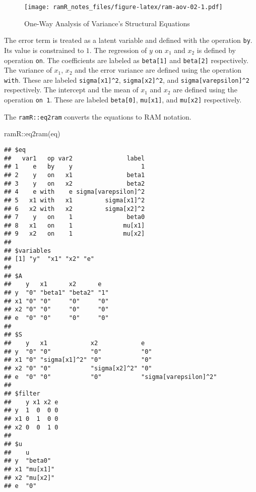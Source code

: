 \documentclass[
]{book}
\newenvironment{Shaded}{\begin{snugshade}}{\end{snugshade}}
\newcommand{\FunctionTok}[1]{\textcolor[rgb]{0.00,0.00,0.00}{#1}}
\newcommand{\NormalTok}[1]{#1}
\newcommand{\SpecialCharTok}[1]{\textcolor[rgb]{0.00,0.00,0.00}{#1}}
\theoremstyle{definition}
\theoremstyle{definition}
\theoremstyle{definition}
\theoremstyle{remark}
\begin{document}
\begin{figure}
\centering
\texttt{[image: ramR\_notes\_files/figure-latex/ram-aov-02-1.pdf]}
\caption{\label{fig:ram-aov-02}One-Way Analysis of Variance's Structural Equations}
\end{figure}

The error term is treated as a latent variable
and defined with the operation \texttt{by}.
Its value is constrained to \(1\).
The regression of \(y\) on \(x_1\) and \(x_2\) is defined by operation \texttt{on}.
The coefficients are labeled as \texttt{beta{[}1{]}} and \texttt{beta{[}2{]}} respectively.
The variance of \(x_1\), \(x_2\) and the error variance
are defined using the operation \texttt{with}.
These are labeled \texttt{sigma{[}x1{]}\^{}2}, \texttt{sigma{[}x2{]}\^{}2}, and \texttt{sigma{[}varepsilon{]}\^{}2} respectively.
The intercept and the mean of \(x_1\) and \(x_2\) are defined using the operation \texttt{on\ 1}.
These are labeled \texttt{beta{[}0{]}}, \texttt{mu{[}x1{]}}, and \texttt{mu{[}x2{]}} respectively.

The \texttt{ramR::eq2ram} converts the equations to RAM notation.

\begin{Shaded}
\begin{Highlighting}[]
\NormalTok{ramR}\SpecialCharTok{::}\FunctionTok{eq2ram}\NormalTok{(eq)}
\end{Highlighting}
\end{Shaded}

\begin{verbatim}
## $eq
##   var1   op var2               label
## 1    e   by    y                   1
## 2    y   on   x1               beta1
## 3    y   on   x2               beta2
## 4    e with    e sigma[varepsilon]^2
## 5   x1 with   x1         sigma[x1]^2
## 6   x2 with   x2         sigma[x2]^2
## 7    y   on    1               beta0
## 8   x1   on    1              mu[x1]
## 9   x2   on    1              mu[x2]
## 
## $variables
## [1] "y"  "x1" "x2" "e" 
## 
## $A
##    y   x1      x2      e  
## y  "0" "beta1" "beta2" "1"
## x1 "0" "0"     "0"     "0"
## x2 "0" "0"     "0"     "0"
## e  "0" "0"     "0"     "0"
## 
## $S
##    y   x1            x2            e                    
## y  "0" "0"           "0"           "0"                  
## x1 "0" "sigma[x1]^2" "0"           "0"                  
## x2 "0" "0"           "sigma[x2]^2" "0"                  
## e  "0" "0"           "0"           "sigma[varepsilon]^2"
## 
## $filter
##    y x1 x2 e
## y  1  0  0 0
## x1 0  1  0 0
## x2 0  0  1 0
## 
## $u
##    u       
## y  "beta0" 
## x1 "mu[x1]"
## x2 "mu[x2]"
## e  "0"
\end{verbatim}
\end{document}
